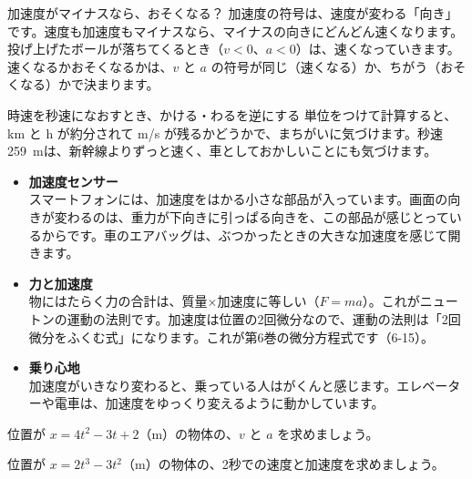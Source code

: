 \begin{tsumazuki}{加速度がマイナスなら、おそくなる？}
加速度の符号は、速度が変わる「向き」です。速度も加速度もマイナスなら、マイナスの向きにどんどん速くなります。投げ上げたボールが落ちてくるとき（$v<0$、$a<0$）は、速くなっていきます。速くなるかおそくなるかは、$v$ と $a$ の符号が同じ（速くなる）か、ちがう（おそくなる）かで決まります。
\end{tsumazuki}

\begin{tsumazuki}{時速を秒速になおすとき、かける・わるを逆にする}
単位をつけて計算すると、km と h が約分されて m/s が残るかどうかで、まちがいに気づけます。秒速\qty{259}{m}は、新幹線よりずっと速く、車としておかしいことにも気づけます。
\end{tsumazuki}

\begin{butsuri}
\begin{itemize}[leftmargin=1.2\zw, itemsep=2pt, topsep=0pt, label={\color{bkPurple}●}]
\item \textbf{加速度センサー}\\
スマートフォンには、加速度をはかる小さな部品が入っています。画面の向きが変わるのは、重力が下向きに引っぱる向きを、この部品が感じとっているからです。車のエアバッグは、ぶつかったときの大きな加速度を感じて開きます。
\item \textbf{力と加速度}\\
物にはたらく力の合計は、質量×加速度に等しい（$F=ma$）。これがニュートンの運動の法則です。加速度は位置の2回微分なので、運動の法則は「2回微分をふくむ式」になります。これが第6巻の微分方程式です（6-15）。
\item \textbf{乗り心地}\\
加速度がいきなり変わると、乗っている人はがくんと感じます。エレベーターや電車は、加速度をゆっくり変えるように動かしています。
\end{itemize}
\end{butsuri}

\bkendproblems
{}

\bkproblem 位置が $x=4t^2-3t+2$（m）の物体の、$v$ と $a$ を求めましょう。

\bkproblem 位置が $x=2t^3-3t^2$（m）の物体の、2秒での速度と加速度を求めましょう。

